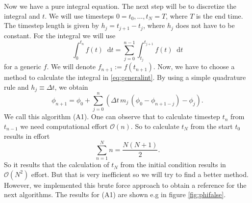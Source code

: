 \documentclass[12pt,a4paper,twoside, open=right]{scrreprt}
\theoremstyle{definition}
\theoremstyle{plain}
\newcommand{\D}{\mathop{}\!\mathrm{d}}
\begin{document}
Now we have a pure integral equation. The next step will be to discretize the integral and $t$.
We will use timesteps $0=t_0,\dotsc,t_N=T$, where $T$ is the end time. The timestep length is given by $h_j=t_{j+1}-t_j$, where $h_j$ does not have to be constant. For the integral we will use 
\begin{equation}
    \int_0^{t_n}f(t)\D t=\sum_{j=0}^{n-1}\int_{t_j}^{t_{j+1}}f(t)\D t\label{eq:generalint}
\end{equation}
for a generic $f$. We will denote $f_{n+1}:=f(t_{n+1})$. Now, we have to choose a method to calculate the integral in \eqref{eq:generalint}. By using a simple quadrature rule and $h_j\equiv \Delta t$, we obtain
\begin{equation}
    \phi_{n+1}=\phi_0 + \sum_{j=0}^{n}\left(\Delta t\, m_j\,(\phi_0-\phi_{n+1-j})-\phi_j\right).
\end{equation} We call this algorithm (A1).
One can observe that to calculate timestep $t_n$ from $t_{n-1}$ we need computational effort $\mathcal{O}(n)$. So to calculate $t_N$ from the start $t_0$ results in effort
\begin{equation}
    \sum_{n=1}^Nn=\frac{N(N+1)}{2}.
\end{equation}
So it results that the calculation of $t_N$ from the initial condition results in $\mathcal{O}(N^2)$ effort.
But that is very inefficient so we will try to find a better method. However, we implemented this brute force approach to obtain a reference for the next algorithms. The results for (A1) are shown e.g in figure \ref{fig:phifalse}.
\end{document}
